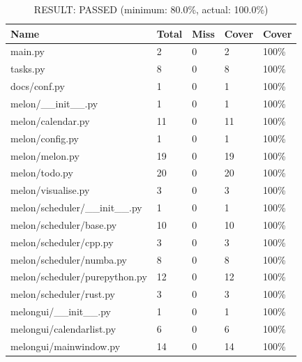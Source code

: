 \documentclass{prettytex/ox/mmsc-special-topic}
\begin{document}
  \begin{table}[H]
    \centering
    \caption{RESULT: PASSED (minimum: 80.0\%, actual: 100.0\%)}
    \begin{tabular}{lllll}
      \hline
      \bf Name                        & \bf Total & \bf Miss & \bf Cover & \bf Cover \\
      \hline
      main.py                         & 2         & 0        & 2         & 100\%     \\
      tasks.py                        & 8         & 0        & 8         & 100\%     \\
      docs/conf.py                    & 1         & 0        & 1         & 100\%     \\
      melon/\_\_init\_\_.py           & 1         & 0        & 1         & 100\%     \\
      melon/calendar.py               & 11        & 0        & 11        & 100\%     \\
      melon/config.py                 & 1         & 0        & 1         & 100\%     \\
      melon/melon.py                  & 19        & 0        & 19        & 100\%     \\
      melon/todo.py                   & 20        & 0        & 20        & 100\%     \\
      melon/visualise.py              & 3         & 0        & 3         & 100\%     \\
      melon/scheduler/\_\_init\_\_.py & 1         & 0        & 1         & 100\%     \\
      melon/scheduler/base.py         & 10        & 0        & 10        & 100\%     \\
      melon/scheduler/cpp.py          & 3         & 0        & 3         & 100\%     \\
      melon/scheduler/numba.py        & 8         & 0        & 8         & 100\%     \\
      melon/scheduler/purepython.py   & 12        & 0        & 12        & 100\%     \\
      melon/scheduler/rust.py         & 3         & 0        & 3         & 100\%     \\
      melongui/\_\_init\_\_.py        & 1         & 0        & 1         & 100\%     \\
      melongui/calendarlist.py        & 6         & 0        & 6         & 100\%     \\
      melongui/mainwindow.py          & 14        & 0        & 14        & 100\%     \\

\end{tabular}
\end{table}
\end{document}

